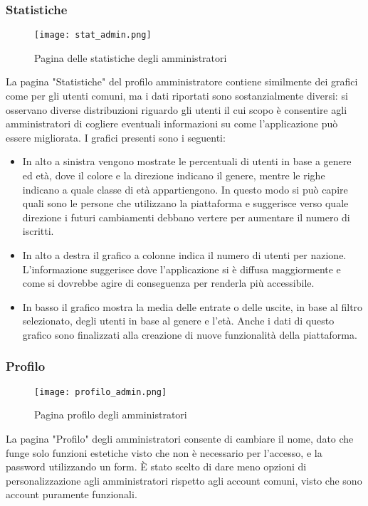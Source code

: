 \documentclass[binding=0.6cm, oneside, noexaminfo, italian]{sapthesis}
\begin{document}
\subsubsection{Statistiche}
\begin{figure}[h]
    \centering
    \texttt{[image: stat\_admin.png]}
    \caption{Pagina delle statistiche degli amministratori}
    \label{fig:statistiche_admin}
\end{figure}
La pagina "Statistiche" del profilo amministratore contiene similmente dei grafici come per gli utenti comuni, ma i dati riportati sono sostanzialmente diversi: si osservano diverse distribuzioni riguardo gli utenti il cui scopo è consentire agli amministratori di cogliere eventuali informazioni su come l'applicazione può essere migliorata.
I grafici presenti sono i seguenti:
\begin{itemize}
    \item In alto a sinistra vengono mostrate le percentuali di utenti in base a genere ed età, dove il colore e la direzione indicano il genere, mentre le righe indicano a quale classe di età appartiengono. In questo modo si può capire quali sono le persone che utilizzano la piattaforma e suggerisce verso quale direzione i futuri cambiamenti debbano vertere per aumentare il numero di iscritti.
    \item In alto a destra il grafico a colonne indica il numero di utenti per nazione. L'informazione suggerisce dove l'applicazione si è diffusa maggiormente e come si dovrebbe agire di conseguenza per renderla più accessibile.
    \item In basso il grafico mostra la media delle entrate o delle uscite, in base al filtro selezionato, degli utenti in base al genere e l'età. Anche i dati di questo grafico sono finalizzati alla creazione di nuove funzionalità della piattaforma.
\end{itemize}
\subsubsection{Profilo}
\begin{figure}[h]
    \centering
    \texttt{[image: profilo\_admin.png]}
    \caption{Pagina profilo degli amministratori}
    \label{fig:profilo_admin}
\end{figure}
La pagina "Profilo" degli amministratori consente di cambiare il nome, dato che funge solo funzioni estetiche visto che non è necessario per l'accesso, e la password utilizzando un form. \MakeUppercase{è} stato scelto di dare meno opzioni di personalizzazione agli amministratori rispetto agli account comuni, visto che sono account puramente funzionali.
\newpage
\end{document}
